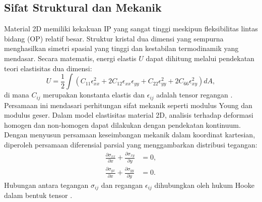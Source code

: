\subsection{Sifat Struktural dan Mekanik}
Material 2D memiliki kekakuan IP yang sangat tinggi meskipun fleksibilitas lintas bidang (OP) relatif besar.
Struktur kristal dua dimensi yang sempurna menghasilkan simetri spasial yang tinggi dan kestabilan termodinamik yang mendasar.
Secara matematis, energi elastis \( U \) dapat dihitung melalui pendekatan teori elastisitas dua dimensi:
\begin{equation}
    U = \frac{1}{2} \int \left( C_{11}\epsilon_{xx}^2 + 2C_{12}\epsilon_{xx}\epsilon_{yy} + C_{22}\epsilon_{yy}^2 + 2C_{66}\epsilon_{xy}^2 \right) dA,
\end{equation}
di mana \( C_{ij} \) merupakan konstanta elastis dan \( \epsilon_{ij} \) adalah tensor regangan \citep{Lee2008}.
Persamaan ini mendasari perhitungan sifat mekanik seperti modulus Young dan modulus geser.
Dalam model elastisitas material 2D, analisis terhadap deformasi homogen dan non-homogen dapat dilakukan dengan pendekatan kontinuum.
Dengan menyusun persamaan keseimbangan mekanik dalam koordinat kartesian, diperoleh persamaan diferensial parsial yang menggambarkan distribusi tegangan:
\begin{align}
    \frac{\partial \sigma_{xx}}{\partial x} + \frac{\partial \sigma_{xy}}{\partial y} &= 0, \nonumber \\
    \frac{\partial \sigma_{yx}}{\partial x} + \frac{\partial \sigma_{yy}}{\partial y} &= 0.
\end{align}
Hubungan antara tegangan \( \sigma_{ij} \) dan regangan \( \epsilon_{ij} \) dihubungkan oleh hukum Hooke dalam bentuk tensor \citep{Timoshenko1970}.

